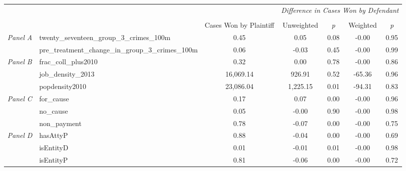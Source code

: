 \begin{tabular}{llccccc}
\toprule
 &  & \textit{} & \multicolumn{4}{c}{\textit{Difference in Cases Won by Defendant}} \\
\cline{4-7}
\\
 &  & Cases Won by Plaintiff & Unweighted & \emph{p} & Weighted & \emph{p} \\
\midrule
\multirow[c]{2}{3cm}{\textit{Panel A}} & twenty_seventeen_group_3_crimes_100m & 0.45 & 0.05 & 0.08 & -0.00 & 0.95 \\
 & pre_treatment_change_in_group_3_crimes_100m & 0.06 & -0.03 & 0.45 & -0.00 & 0.99 \\
\cline{1-7}
\multirow[c]{3}{3cm}{\textit{Panel B}} & frac_coll_plus2010 & 0.32 & 0.00 & 0.78 & -0.00 & 0.86 \\
 & job_density_2013 & 16,069.14 & 926.91 & 0.52 & -65.36 & 0.96 \\
 & popdensity2010 & 23,086.04 & 1,225.15 & 0.01 & -94.31 & 0.83 \\
\cline{1-7}
\multirow[c]{3}{3cm}{\textit{Panel C}} & for_cause & 0.17 & 0.07 & 0.00 & -0.00 & 0.96 \\
 & no_cause & 0.05 & -0.00 & 0.90 & -0.00 & 0.98 \\
 & non_payment & 0.78 & -0.07 & 0.00 & -0.00 & 0.75 \\
\cline{1-7}
\multirow[c]{3}{3cm}{\textit{Panel D}} & hasAttyP & 0.88 & -0.04 & 0.00 & -0.00 & 0.69 \\
 & isEntityD & 0.01 & -0.01 & 0.01 & -0.00 & 0.98 \\
 & isEntityP & 0.81 & -0.06 & 0.00 & -0.00 & 0.72 \\
\cline{1-7}
\bottomrule
\end{tabular}
